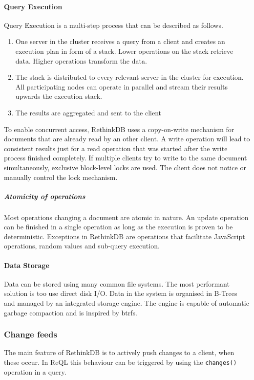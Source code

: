 \paragraph{Query Execution}
\label{sec:rethink_arch_query_execution}
Query Execution is a multi-step process that can be described as follows.

\begin{enumerate}
    \item One server in the cluster receives a query from a client and creates an execution plan in form of a stack. Lower operations on the stack retrieve data. Higher operations transform the data.
    \item The stack is distributed to every relevant server in the cluster for execution. All participating nodes can operate in parallel and stream their results upwards the execution stack.
    \item The results are aggregated and sent to the client
\end{enumerate}

To enable concurrent access, RethinkDB uses a copy-on-write mechanism for documents that are already read by an other client. A write operation will lead to consistent results just for a read operation that was started after the write process finished completely. If multiple clients try to write to the same document simultaneously, exclusive block-level locks are used. The client does not notice or manually control the lock mechanism.

\subparagraph{Atomicity of operations}
Most operations changing a document are atomic in nature. An update operation can be finished in a single operation as long as the execution is proven to be deterministic. Exceptions in RethinkDB are operations that facilitate JavaScript operations, random values and sub-query execution.

\paragraph{Data Storage}
Data can be stored using many common file systems. The most performant solution is too use direct disk I/O. Data in the system is organised in B-Trees and managed by an integrated storage engine. The engine is capable of automatic garbage compaction and is inspired by \gls{btrfs}.

\subsubsection{Change feeds}
\label{sec:rethink_changefeeds}
The main feature of RethinkDB is to actively push changes to a client, when these occur. In ReQL this behaviour can be triggered by using the \texttt{changes()} operation in a query\autocite{rethinkdb:changefeeds}.

